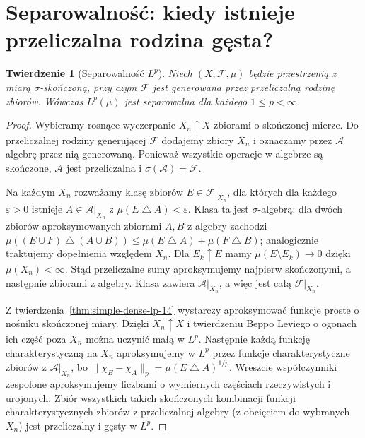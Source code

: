 \documentclass[11pt,a4paper,oneside]{book}
\numberwithin{equation}{chapter}
\theoremstyle{plain}
\newtheorem{twierdzenie}{Twierdzenie}[chapter]
\theoremstyle{definition}
\theoremstyle{remark}
\begin{document}
\section{Separowalność: kiedy istnieje przeliczalna rodzina gęsta?}

\begin{twierdzenie}[Separowalność $L^p$]
\label{thm:separable-lp-14}
Niech $(X,\mathcal F,\mu)$ będzie przestrzenią
z miarą $\sigma$-skończoną, przy czym $\mathcal F$
jest generowana przez przeliczalną rodzinę zbiorów.
Wówczas $L^p(\mu)$ jest separowalna dla
każdego $1\le p<\infty$.
\end{twierdzenie}
\begin{proof}
Wybieramy rosnące wyczerpanie $X_n\uparrow X$
zbiorami o skończonej mierze. Do przeliczalnej
rodziny generującej $\mathcal F$ dodajemy zbiory $X_n$
i oznaczamy przez $\mathcal A$ algebrę przez nią generowaną.
Ponieważ wszystkie operacje w algebrze są skończone,
$\mathcal A$ jest przeliczalna i $\sigma(\mathcal A)=\mathcal F$.

Na każdym $X_n$ rozważamy klasę zbiorów $E\in\mathcal F|_{X_n}$,
dla których dla każdego $\varepsilon>0$ istnieje
$A\in\mathcal A|_{X_n}$ z
$\mu(E\mathbin\triangle A)<\varepsilon$.
Klasa ta jest $\sigma$-algebrą: dla dwóch zbiorów
aproksymowanych zbiorami $A,B$ z algebry zachodzi
$\mu((E\cup F)\mathbin\triangle(A\cup B))\le
\mu(E\mathbin\triangle A)+\mu(F\mathbin\triangle B)$;
analogicznie traktujemy dopełnienia względem $X_n$.
Dla $E_k\uparrow E$ mamy
$\mu(E\setminus E_k)\to0$ dzięki
$\mu(X_n)<\infty$. Stąd przeliczalne sumy
aproksymujemy najpierw skończonymi, a następnie
zbiorami z algebry. Klasa zawiera $\mathcal A|_{X_n}$,
a więc jest całą $\mathcal F|_{X_n}$.

Z twierdzenia~\ref{thm:simple-dense-lp-14}
wystarczy aproksymować funkcje proste o nośniku
skończonej miary. Dzięki $X_n\uparrow X$ i twierdzeniu
Beppo Leviego o ogonach ich część poza $X_n$
można uczynić małą w $L^p$. Następnie każdą
funkcję charakterystyczną na $X_n$ aproksymujemy
w $L^p$ przez funkcje charakterystyczne zbiorów z
$\mathcal A|_{X_n}$, bo
$\|\chi_E-\chi_A\|_p
=\mu(E\mathbin\triangle A)^{1/p}$.
Wreszcie współczynniki zespolone aproksymujemy
liczbami o wymiernych częściach rzeczywistych
i urojonych. Zbiór wszystkich takich skończonych
kombinacji funkcji charakterystycznych zbiorów z przeliczalnej
algebry (z obcięciem do wybranych $X_n$) jest
przeliczalny i gęsty w $L^p$.
\end{proof}
\end{document}
